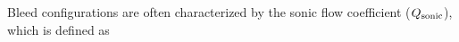 \documentclass{article}
\begin{document}
Bleed configurations are often characterized by the sonic flow coefficient ($Q_{\textrm{sonic}}$), which is defined as \cite{Slater2012}

%
\ifdraft
  \printbibliography
\fi
\end{document}
